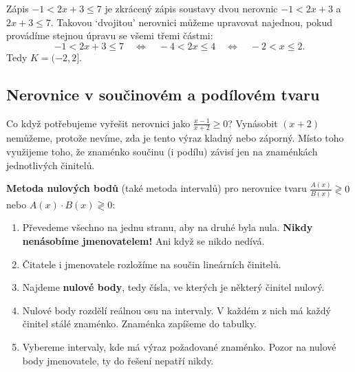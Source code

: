 \begin{example}
  Zápis $-1 < 2x + 3\leq 7$ je zkrácený zápis soustavy dvou nerovnic $-1 < 2x + 3$ a $2x + 3\leq 7$. Takovou `dvojitou' nerovnici můžeme upravovat najednou, pokud provádíme stejnou úpravu se všemi třemi částmi:
  \begin{equation*}
    -1 < 2x + 3\leq 7\quad\Leftrightarrow\quad -4 < 2x\leq 4\quad\Leftrightarrow\quad -2 < x\leq 2.
  \end{equation*}
  Tedy $K = (-2, 2]$.
\end{example}

\subsection{Nerovnice v součinovém a podílovém tvaru}\label{sec:podilove-nerovnice}

Co když potřebujeme vyřešit nerovnici jako $\frac{x - 1}{x + 2}\geq 0$? Vynásobit $(x + 2)$ nemůžeme, protože nevíme, zda je tento výraz kladný nebo záporný. Místo toho využijeme toho, že znaménko součinu (i podílu) závisí jen na znaménkách jednotlivých činitelů.

\begin{definitionbox}
  \textbf{Metoda nulových bodů} (také metoda intervalů) pro nerovnice tvaru $\frac{A(x)}{B(x)}\gtrless 0$ nebo $A(x)\cdot B(x)\gtrless 0$:
  \begin{enumerate}
    \item Převedeme všechno na jednu stranu, aby na druhé byla nula. \textbf{Nikdy nenásobíme jmenovatelem!} Ani když se nikdo nedívá.
    \item Čitatele i jmenovatele rozložíme na součin lineárních činitelů.
    \item Najdeme \textbf{nulové body}, tedy čísla, ve kterých je některý činitel nulový.
    \item Nulové body rozdělí reálnou osu na intervaly. V každém z nich má každý činitel stálé znaménko. Znaménka zapíšeme do tabulky.
    \item Vybereme intervaly, kde má výraz požadované znaménko. Pozor na nulové body jmenovatele, ty do řešení nepatří nikdy.
  \end{enumerate}
\end{definitionbox}

